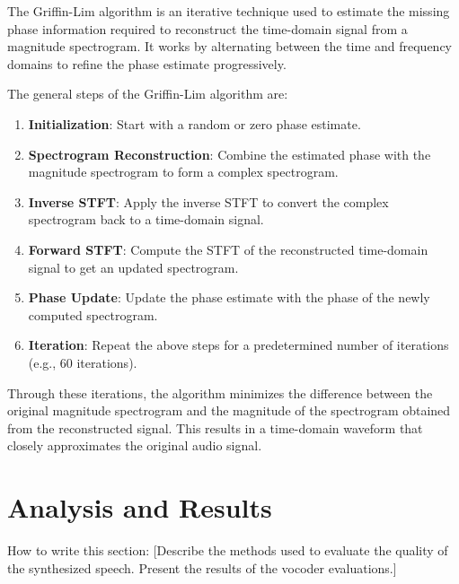\documentclass[12pt]{article}
\begin{document}
The Griffin-Lim algorithm is an iterative technique used to estimate the missing phase information required to reconstruct the time-domain signal from a magnitude spectrogram. It works by alternating between the time and frequency domains to refine the phase estimate progressively.

The general steps of the Griffin-Lim algorithm are:

\begin{enumerate}
    \item \textbf{Initialization}: Start with a random or zero phase estimate.
    \item \textbf{Spectrogram Reconstruction}: Combine the estimated phase with the magnitude spectrogram to form a complex spectrogram.
    \item \textbf{Inverse STFT}: Apply the inverse STFT to convert the complex spectrogram back to a time-domain signal.
    \item \textbf{Forward STFT}: Compute the STFT of the reconstructed time-domain signal to get an updated spectrogram.
    \item \textbf{Phase Update}: Update the phase estimate with the phase of the newly computed spectrogram.
    \item \textbf{Iteration}: Repeat the above steps for a predetermined number of iterations (e.g., 60 iterations).
\end{enumerate}

Through these iterations, the algorithm minimizes the difference between the original magnitude spectrogram and the magnitude of the spectrogram obtained from the reconstructed signal. This results in a time-domain waveform that closely approximates the original audio signal.


\newpage






\section{Analysis and Results}
How to write this section: [Describe the methods used to evaluate the quality of the synthesized speech. Present the results of the vocoder evaluations.]
\end{document}
